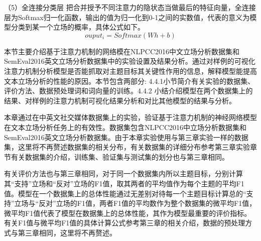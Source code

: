（5）全连接分类层
把合并授予不同注意力的隐状态当做最后的特征向量，全连接层为Softmax归一化函数，输出的值为归一化到0-1之间的实数值，代表的意义为模型分类到某一个立场的概率，具体公式如下。
\begin{equation}\label{conv1} ouput_i=Softmax(Wh+b) \end{equation}



本节主要介绍基于注意力机制的网络模在NLPCC2016中文立场分析数据集和SemEval2016英文立场分析数据集中的实验设置及结果分析。通过对样例的可视化注意力机制分析模型是否能抓取对主题目标其关键性作用的信息，解释模型能提高文本立场分析的性能的原因。本节包含两部分: 4.4.1小节简介有关实验的数据集、评价方法、数据预处理词和词向量的训练。4.4.2 小结介绍模型在两个数据集上的结果、对样例的注意力机制可视化结果分析和对比其他模型的结果与分析。



本章通过在中英文社交媒体数据集上的实验，验证基于注意力机制的神经网络模型在文本立场分析任务上的有效性。数据集包含NLPCC2016中立场分析数据集和SemEval2016英文立场分析数据集。由于本章实验使用与第三章实验一样的数据集，这里将不再赘述数据集的相关分布，有关数据集的详细分布参考第三章实验章节有关数据集的介绍，训练集、验证集与测试集的划分也与第三章相同。

有关评价方法也与第三章相同，对于同一个数据集内所以主题目标，分别计算其“支持”立场和“反对”立场的F1值，取其两者的平均值作为每个主题的平均F1值。模型在一个数据集上的总体性能通过无差别对待每一个主题目标计算总的“支持”立场与“反对”立场的F1值，两者F1值的平均数作为整个数据集的微平均F1值，微平均F1值代表了模型在数据集上的总体性能，其作为模型最重要的评价指标。有关F1值与微平均F1值的具体计算公式参考第三章的相关介绍，数据的预处理方式与第三章相同，这里将不再赘述。

